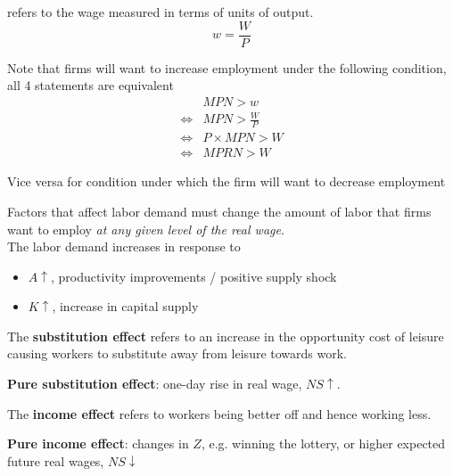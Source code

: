 \documentclass[letterpaper, 9pt,landscape]{extarticle}
\begin{document}
\begin{multicols*}{5}
\begin{definition}
     refers to the wage measured in terms of units of output.
    \[
        w = \frac{W}{P}
    \]
\end{definition}

\begin{remark}
    Note that firms will want to increase employment under the following condition, all 4 statements are equivalent
    \begin{align*}
        & MPN > w  \\
        \iff & MPN > \frac{W}{P}  \\
        \iff & P \times MPN > W  \\
        \iff & MPRN > W 
    \end{align*}

    Vice versa for condition under which the firm will want to decrease employment
\end{remark}

\begin{remark}
Factors that affect labor demand must change the amount of labor that firms want to employ \textit{at any given level of the real wage}.\\

The labor demand increases in response to 
\begin{itemize}
    \item $A \uparrow$, productivity improvements / positive supply shock
    \item $K \uparrow$, increase in capital supply
\end{itemize} 
\end{remark}

\begin{definition}
    The \textbf{substitution effect} refers to an increase in the opportunity cost of leisure causing workers to substitute away from leisure towards work.
\end{definition}

\begin{remark}
    \textbf{Pure substitution effect}: one-day rise in real wage, $NS \uparrow$.  \\
\end{remark}

\begin{definition}
    The \textbf{income effect} refers to workers being better off and hence working less.
\end{definition}
\begin{remark}
    \textbf{Pure income effect}: changes in $Z$, e.g. winning the lottery, or higher expected future real wages, $NS \downarrow$ \\
\end{remark}


\end{multicols*}
\end{document}
